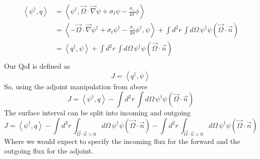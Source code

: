 \documentclass{article}
\newcommand{\vO}{\vec{\Omega}}
\newcommand{\bra}{\left\langle}
\newcommand{\ket}{\right\rangle}
\newcommand{\vgrad}{\vec{\nabla}}
\begin{document}
\begin{align*}
\bra \psi^\dag , q \ket &=  \bra \psi^\dag , \vO \cdot \vgrad \psi + \sigma_t \psi - \frac{\sigma_s}{4 \pi} \phi \ket \\
&=  \bra - \vO \cdot \vgrad \psi^\dag + \sigma_t \psi^\dag - \frac{\sigma_s}{4 \pi} \phi^\dag , \psi \ket + \int d^2 r \, \int d  \Omega \, \psi^\dag \psi ( \vO \cdot \vec{n} ) \\
&=  \bra q^\dag , \psi \ket + \int d^2 r \, \int d  \Omega \, \psi^\dag \psi ( \vO \cdot \vec{n} ) \\
\end{align*}
Our QoI is defined as 
\[
J=\bra q^\dag , \psi \ket
\]
So, using the adjoint manipulation from above
\[
J = \bra \psi^\dag , q \ket - \int d^2 r \, \int d  \Omega \, \psi^\dag \psi ( \vO \cdot \vec{n} )
\]
The surface interval can be split into incoming and outgoing 
\[
J = \bra \psi^\dag , q \ket - \int d^2 r \, \int_{\vO \cdot \vec{n} >0} d  \Omega \, \psi^\dag \psi ( \vO \cdot \vec{n} ) - \int d^2 r \, \int_{\vO \cdot \vec{n} <0} d  \Omega \, \psi^\dag \psi ( \vO \cdot \vec{n} )
\]
Where we would expect to specify the incoming flux for the forward and the outgoing flux for the adjoint.
\end{document}
